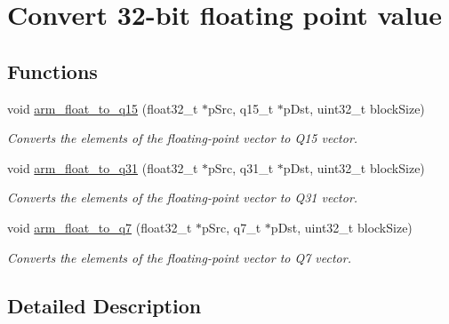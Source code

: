 \hypertarget{group__float__to__x}{\section{Convert 32-\/bit floating point value}
\label{group__float__to__x}
}
\subsection*{Functions}
\begin{DoxyCompactItemize}
\item 
void \hyperlink{group__float__to__x_ga215456e35a18db86882e1d3f0d24e1f2}{arm\-\_\-float\-\_\-to\-\_\-q15} (float32\-\_\-t $\ast$p\-Src, q15\-\_\-t $\ast$p\-Dst, uint32\-\_\-t block\-Size)
\begin{DoxyCompactList}\small\item\em Converts the elements of the floating-\/point vector to Q15 vector. \end{DoxyCompactList}\item 
void \hyperlink{group__float__to__x_ga177704107f94564e9abe4daaa36f4554}{arm\-\_\-float\-\_\-to\-\_\-q31} (float32\-\_\-t $\ast$p\-Src, q31\-\_\-t $\ast$p\-Dst, uint32\-\_\-t block\-Size)
\begin{DoxyCompactList}\small\item\em Converts the elements of the floating-\/point vector to Q31 vector. \end{DoxyCompactList}\item 
void \hyperlink{group__float__to__x_ga44a393818cdee8dce80f2d66add25411}{arm\-\_\-float\-\_\-to\-\_\-q7} (float32\-\_\-t $\ast$p\-Src, q7\-\_\-t $\ast$p\-Dst, uint32\-\_\-t block\-Size)
\begin{DoxyCompactList}\small\item\em Converts the elements of the floating-\/point vector to Q7 vector. \end{DoxyCompactList}\end{DoxyCompactItemize}


\subsection{Detailed Description}


